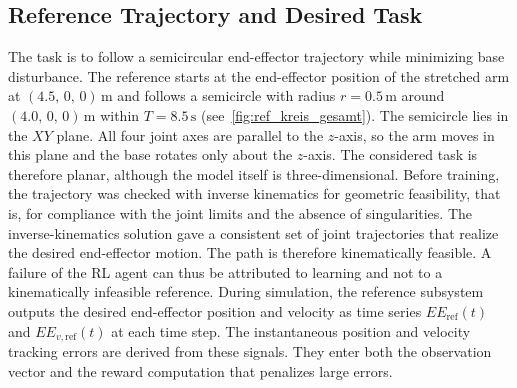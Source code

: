 \documentclass{ieeeaccess}
\begin{document}
\subsection{Reference Trajectory and Desired Task} The task is to follow a semicircular end-effector
trajectory while minimizing base disturbance. The reference starts at the end-effector position of the
stretched arm at $(4.5,\,0,\,0)\,\mathrm{m}$ and follows a semicircle with radius $r = 0.5\,\mathrm{m}$
around $(4.0,\,0,\,0)\,\mathrm{m}$ within $T = 8.5\,\mathrm{s}$ (see~\cref{fig:ref_kreis_gesamt}). The
semicircle lies in the $XY$ plane. All four joint axes are parallel to the $z$-axis, so the arm moves in
this plane and the base rotates only about the $z$-axis. The considered task is therefore planar,
although the model itself is three-dimensional. Before training, the trajectory was checked with inverse
kinematics for geometric feasibility, that is, for compliance with the joint limits and the absence of
singularities. The inverse-kinematics solution gave a consistent set of joint trajectories that realize
the desired end-effector motion. The path is therefore kinematically feasible. A failure of the RL agent
can thus be attributed to learning and not to a kinematically infeasible reference. During simulation,
the reference subsystem outputs the desired end-effector position and velocity as time series
$EE_{\mathrm{ref}}(t)$ and $EE_{v,\mathrm{ref}}(t)$ at each time step. The instantaneous position and
velocity tracking errors are derived from these signals. They enter both the observation vector and the
reward computation that penalizes large errors.

\end{document}
